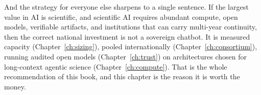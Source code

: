 And the strategy for everyone else sharpens to a single sentence. If the largest value in AI is scientific, and scientific AI requires abundant compute, open models, verifiable artifacts, and institutions that can carry multi-year continuity, then the correct national investment is not a sovereign chatbot. It is measured capacity (Chapter~\ref{ch:sizing}), pooled internationally (Chapter~\ref{ch:consortium}), running audited open models (Chapter~\ref{ch:trust}) on architectures chosen for long-context agentic science (Chapter~\ref{ch:compute}). That is the whole recommendation of this book, and this chapter is the reason it is worth the money.
